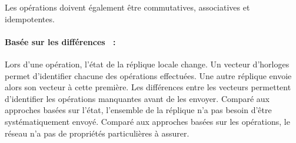 \noindent Les opérations doivent également être commutatives, associatives et
idempotentes.

\paragraph{Basée sur les différences~\cite{vanderlinde2016delta} :} Lors d'une
opération, l'état de la réplique locale change. Un vecteur d'horloges permet
d'identifier chacune des opérations effectuées. Une autre réplique envoie alors
son vecteur à cette première. Les différences entre les vecteurs permettent
d'identifier les opérations manquantes avant de les envoyer. Comparé aux
approches basées sur l'état, l'ensemble de la réplique n'a pas besoin d'être
systématiquement envoyé. Comparé aux approches basées sur les opérations, le
réseau n'a pas de propriétés particulières à assurer.

%     
%     



